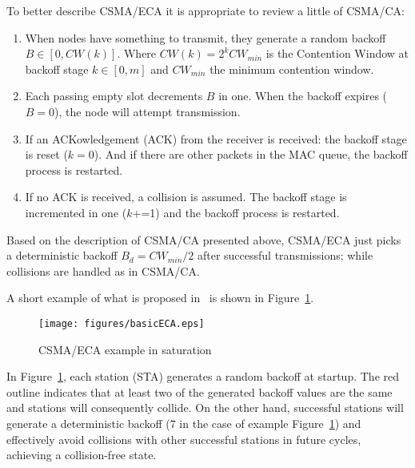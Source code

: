 \documentclass[conference]{IEEEtran}
\begin{document}
To better describe CSMA/ECA it is appropriate to review a little of CSMA/CA:

\begin{enumerate}
	\item When nodes have something to transmit, they generate a random backoff $B\in[0,CW(k)]$. Where $CW(k)=2^{k}CW_{min}$ is the Contention Window at backoff stage $k\in[0,m]$ and $CW_{min}$ the minimum contention window.
	\item Each passing empty slot decrements $B$ in one. When the backoff expires ($B=0$), the node will attempt transmission.
	\item If an ACKowledgement (ACK) from the receiver is received: the backoff stage is reset ($k=0$). And if there are other packets in the MAC queue, the backoff process is restarted.\label{reset}
	\item If no ACK is received, a collision is assumed. The backoff stage is incremented in one ($k$+=1) and the backoff process is restarted.
\end{enumerate}

Based on the description of CSMA/CA presented above, CSMA/ECA just picks a deterministic backoff $B_{d}=CW_{min}/2$ after successful transmissions; while collisions are handled as in CSMA/CA.

A short example of what is proposed in~\cite{barcelo2008lba} is shown in Figure~\ref{Basic-ECA}.


\begin{figure}[htbp]
\centering
  \texttt{[image: figures/basicECA.eps]}
  \caption{CSMA/ECA example in saturation}
  \label{Basic-ECA}
\end{figure}

In Figure~\ref{Basic-ECA}, each station (STA) generates a random backoff at startup. The red outline indicates that at least two of the generated backoff values are the same and stations will consequently collide. On the other hand, successful stations will generate a deterministic backoff ($7$ in the case of example Figure~\ref{Basic-ECA}) and effectively avoid collisions with other successful stations in future cycles, achieving a collision-free state.
\end{document}
